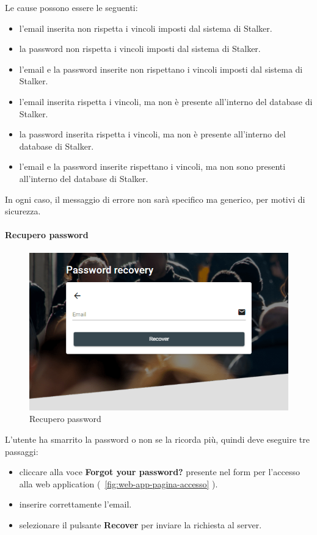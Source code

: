\documentclass[../manuale-utente.tex]{subfiles}
\begin{document}
Le cause possono essere le seguenti:
\begin{itemize}
    \item l'email inserita non rispetta i vincoli imposti dal sistema di Stalker.
    \item la password non rispetta i vincoli imposti dal sistema di Stalker.
    \item l'email e la password inserite non rispettano i vincoli imposti dal sistema di Stalker.
    \item l'email inserita rispetta i vincoli, ma non è presente all'interno del database di Stalker.
    \item la password inserita rispetta i vincoli, ma non è presente all'interno del database di Stalker.
    \item l'email e la password inserite rispettano i vincoli, ma non sono presenti all'interno del database di Stalker.
\end{itemize}

In ogni caso, il messaggio di errore non sarà specifico ma generico, per motivi di sicurezza.
\newpage

\paragraph{Recupero password}%
\label{par:recupero-password}

\begin{figure}[H]
    \centering
    \includegraphics[width=150mm]{img/web-app/recupero-password.PNG}
    \caption{Recupero password}%
    \label{fig:web-app-recupero-password}
\end{figure}

L'utente ha smarrito la password o non se la ricorda più, quindi deve eseguire tre passaggi:
\begin{itemize}
    \item cliccare alla voce \textbf{Forgot your password?} presente nel form per l'accesso alla web application (~\ref{fig:web-app-pagina-accesso} ).
    \item inserire correttamente l'email.
    \item selezionare il pulsante \textbf{Recover} per inviare la richiesta al server.
\end{itemize}
\end{document}
